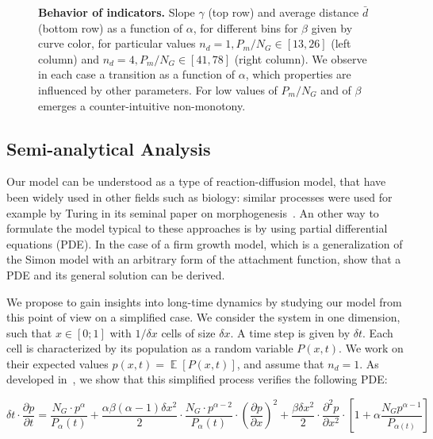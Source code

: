 \documentclass[10pt,letterpaper]{article}
\DeclareMathOperator{\E}{\mathbb{E}}
\newcommand{\Eb}[1]{\ensuremath{\E\!\left[#1\right]}}
\begin{document}
\begin{figure}[!h]
\caption{\textbf{Behavior of indicators.} Slope $\gamma$ (top row) and average distance $\bar{d}$ (bottom row) as a function of $\alpha$, for different bins for $\beta$ given by curve color, for particular values $n_d=1,P_m/N_G\in\left[13,26\right]$ (left column) and $n_d=4,P_m/N_G\in\left[41,78\right]$ (right column). We observe in each case a transition as a function of $\alpha$, which properties are influenced by other parameters. For low values of $P_m/N_G$ and of $\beta$ emerges a counter-intuitive non-monotony.}
\label{fig:fig4}
\end{figure}






\subsection*{Semi-analytical Analysis}\label{subsec:analytical}

Our model can be understood as a type of reaction-diffusion model, that have been widely used in other fields such as biology: similar processes were used for example by Turing in its seminal paper on morphogenesis~\cite{turing1952chemical}. An other way to formulate the model typical to these approaches is by using partial differential equations (PDE). In the case of a firm growth model, which is a generalization of the Simon model with an arbitrary form of the attachment function, \cite{2017arXiv171007580R} show that a PDE and its general solution can be derived.

We propose to gain insights into long-time dynamics by studying our model from this point of view on a simplified case. We consider the system in one dimension, such that $x\in \left[0;1\right]$ with $1/\delta x$ cells of size $\delta x$. A time step is given by $\delta t$. Each cell is characterized by its population as a random variable $P(x,t)$. We work on their expected values $p(x,t) = \Eb{P(x,t)}$, and assume that $n_d=1$. As developed in~, we show that this simplified process verifies the following PDE:

\begin{equation}\label{eq:pde}
\delta t \cdot \frac{\partial p}{\partial t} = \frac{N_G \cdot p^{\alpha}}{P_{\alpha}(t)} + \frac{\alpha \beta (\alpha - 1) \delta x^2}{2}\cdot \frac{N_G \cdot p^{\alpha-2}}{P_{\alpha}(t)} \cdot \left(\frac{\partial p}{\partial x}\right)^2 + \frac{\beta \delta x^2}{2} \cdot \frac{\partial^2 p}{\partial x^2} \cdot\left[ 1 + \alpha \frac{N_G p^{\alpha - 1}}{P_{\alpha(t)}} \right]
\end{equation}
\end{document}
